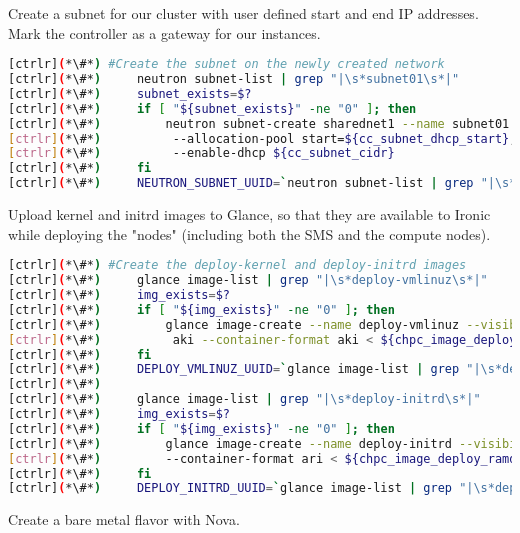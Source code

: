 	Create a subnet for our cluster with user defined start and end IP addresses. Mark the controller as a gateway for our instances.


\begin{lstlisting}[language=bash,keywords={}]
[ctrlr](*\#*) #Create the subnet on the newly created network
[ctrlr](*\#*)     neutron subnet-list | grep "|\s*subnet01\s*|"
[ctrlr](*\#*)     subnet_exists=$?
[ctrlr](*\#*)     if [ "${subnet_exists}" -ne "0" ]; then
[ctrlr](*\#*)         neutron subnet-create sharednet1 --name subnet01 --ip-version=4 --gateway=${controller_ip} \
[ctrlr](*\#*)          --allocation-pool start=${cc_subnet_dhcp_start},end=${cc_subnet_dhcp_end} \
[ctrlr](*\#*)          --enable-dhcp ${cc_subnet_cidr}
[ctrlr](*\#*)     fi
[ctrlr](*\#*)     NEUTRON_SUBNET_UUID=`neutron subnet-list | grep "|\s*subnet01\s*|" | awk '{print $2}'`
\end{lstlisting} 

	Upload kernel and initrd images to Glance, so that they are available to Ironic while deploying the "nodes" (including both the SMS and the compute nodes).


\begin{lstlisting}[language=bash,keywords={}]
[ctrlr](*\#*) #Create the deploy-kernel and deploy-initrd images
[ctrlr](*\#*)     glance image-list | grep "|\s*deploy-vmlinuz\s*|"
[ctrlr](*\#*)     img_exists=$?
[ctrlr](*\#*)     if [ "${img_exists}" -ne "0" ]; then
[ctrlr](*\#*)         glance image-create --name deploy-vmlinuz --visibility public --disk-format \
[ctrlr](*\#*)          aki --container-format aki < ${chpc_image_deploy_kernel}
[ctrlr](*\#*)     fi
[ctrlr](*\#*)     DEPLOY_VMLINUZ_UUID=`glance image-list | grep "|\s*deploy-vmlinuz\s*|" | awk '{print $2}'`
[ctrlr](*\#*) 
[ctrlr](*\#*)     glance image-list | grep "|\s*deploy-initrd\s*|"
[ctrlr](*\#*)     img_exists=$?
[ctrlr](*\#*)     if [ "${img_exists}" -ne "0" ]; then
[ctrlr](*\#*)         glance image-create --name deploy-initrd --visibility public --disk-format ari \
[ctrlr](*\#*)         --container-format ari < ${chpc_image_deploy_ramdisk}
[ctrlr](*\#*)     fi
[ctrlr](*\#*)     DEPLOY_INITRD_UUID=`glance image-list | grep "|\s*deploy-initrd\s*|" | awk '{print $2}'`
\end{lstlisting} 

	Create a bare metal flavor with Nova.

